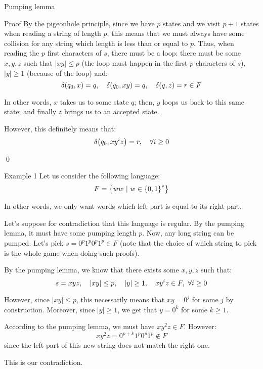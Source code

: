 \documentclass[a4paper]{article}
\begin{document}
\begin{parag}{Pumping lemma}
\begin{subparag}{Proof}
        By the pigeonhole principle, since we have $p$ states and we visit $p+1$ states when reading a string of length $p$, this means that we must always have some collision for any string which length is less than or equal to $p$. Thus, when reading the $p$ first characters of $s$, there must be a loop: there must be some $x, y, z$ such that $\left|xy\right| \leq p$ (the loop must happen in the first $p$ characters of $s$), $\left|y\right| \geq 1$ (because of the loop) and:
        \[\delta\left(q_0, x\right) = q, \mathspace \delta\left(q_0, xy\right) = q, \mathspace \delta\left(q, z\right) = r \in F\]
        
        In other words, $x$ takes us to some state $q$; then, $y$ loops us back to this same state; and finally $z$ brings us to an accepted state. 

        However, this definitely means that: 
        \[\delta\left(q_0, xy^i z\right) = r, \mathspace \forall i \geq 0\]

        \qed
    \end{subparag}
\end{parag}

\begin{parag}{Example 1}
    Let us consider the following language: 
    \[F = \left\{ww \suchthat w \in \left\{0, 1\right\}^*\right\}\]
    
    In other words, we only want words which left part is equal to its right part.

    Let's suppose for contradiction that this language is regular. By the pumping lemma, it must have some pumping length $p$. Now, any long string can be pumped. Let's pick $s = 0^p 1^p 0^p 1^p \in F$ (note that the choice of which string to pick is the whole game when doing such proofs).

    By the pumping lemma, we know that there exists some $x, y, z$ such that:
    \[s = xyz, \mathspace \left|xy\right| \leq p, \mathspace \left|y\right| \geq 1, \mathspace xy^i z \in F,\ \forall i \geq 0\]

    However, since $\left|xy\right| \leq p$, this necessarily means that $xy = 0^j$ for some $j$ by construction. Moreover, since $\left|y\right| \geq 1$, we get that $y = 0^k$ for some $k \geq 1$.

    According to the pumping lemma, we must have $x y^2 z \in F$. However: 
    \[xy^2 z = 0^{p+k} 1^p 0^p 1^p \not \in F\]
    since the left part of this new string does not match the right one.
    
    This is our contradiction.
\end{parag}
\end{document}
